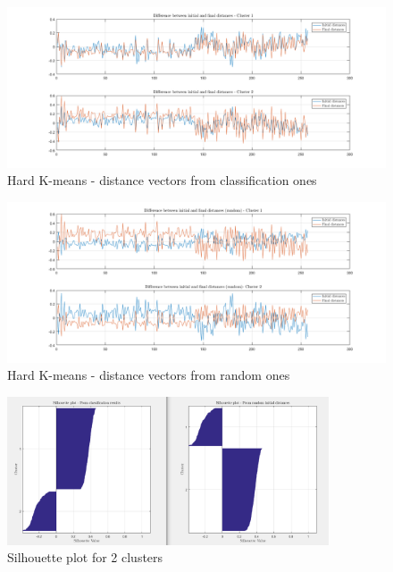 \documentclass{article}
\begin{document}
\begin{figure}[H]
	\centering
	\includegraphics[width=1\textwidth]{pictures/kmeans_2clust_perf.png}
	\caption{Hard K-means - distance vectors from classification ones}\label{fig:kmeans_2clust_perf}
\end{figure}

\begin{figure}[H]
	\centering
	\includegraphics[width=1\textwidth]{pictures/kmeans_random_2clust.png}
	\caption{Hard K-means - distance vectors from random ones}\label{fig:kmeans_2_clust_random}
\end{figure}

\begin{figure}[H]
	\centering
	\includegraphics[width=0.85\textwidth]{pictures/silhouette2cl.png}
	\caption{Silhouette plot for 2 clusters}\label{fig:silhouette2cl}
\end{figure}
\end{document}
